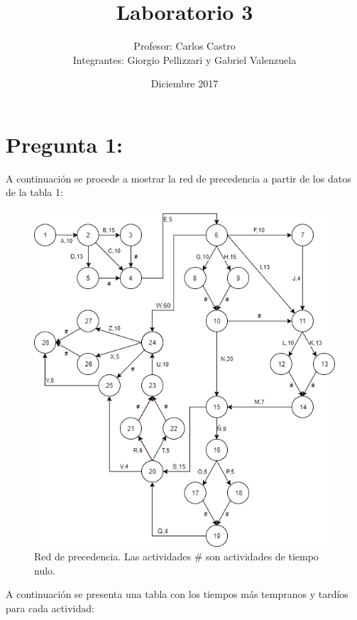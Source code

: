 \documentclass[]{article}
\title{Laboratorio 3}
\author{Profesor: Carlos Castro\\ 
        Integrantes: Giorgio Pellizzari y Gabriel Valenzuela}
\date{Diciembre 2017}
\begin{document}
\maketitle
\thispagestyle{fancy}

\section{Pregunta 1:}

A continuación se procede a mostrar la red de precedencia a partir de los datos de la tabla 1:

\begin{figure}[ht] 
\centering
\includegraphics[scale=0.56]{imagenes/grafo.png}
\caption{Red de precedencia. Las actividades \# son actividades de tiempo nulo.}
\end{figure}

A continuación se presenta una tabla con los tiempos más tempranos y tardíos para cada actividad:
\end{document}
